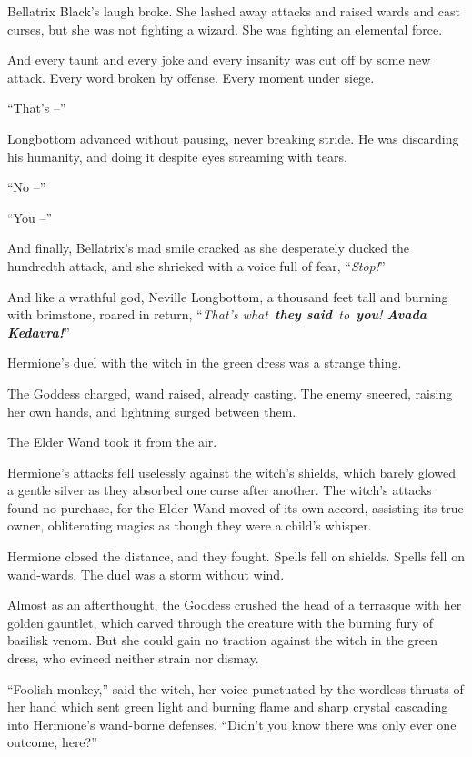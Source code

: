 Bellatrix Black's laugh broke. She lashed away attacks and raised wards
and cast curses, but she was not fighting a wizard. She was fighting an
elemental force.

And every taunt and every joke and every insanity was cut off by some
new attack. Every word broken by offense. Every moment under siege.

``That's --''

Longbottom advanced without pausing, never breaking stride. He was
discarding his humanity, and doing it despite eyes streaming with tears.

``No --''

``You --''

And finally, Bellatrix's mad smile cracked as she desperately ducked the
hundredth attack, and she shrieked with a voice full of fear,
``\emph{Stop!}''

And like a wrathful god, Neville Longbottom, a thousand feet tall and
burning with brimstone, roared in return, ``\emph{That's
what~\textbf{they said}~to~\textbf{you}! \textbf{Avada Kedavra!}}''

\mybreak

Hermione's duel with the witch in the green dress was a strange thing.

The Goddess charged, wand raised, already casting. The enemy sneered,
raising her own hands, and lightning surged between them.

The Elder Wand took it from the air.

Hermione's attacks fell uselessly against the witch's shields, which
barely glowed a gentle silver as they absorbed one curse after another.
The witch's attacks found no purchase, for the Elder Wand moved of its
own accord, assisting its true owner, obliterating magics as though they
were a child's whisper.

Hermione closed the distance, and they fought. Spells fell on shields.
Spells fell on wand-wards. The duel was a storm without wind.

Almost as an afterthought, the Goddess crushed the head of a terrasque
with her golden gauntlet, which carved through the creature with the
burning fury of basilisk venom. But she could gain no traction against
the witch in the green dress, who evinced neither strain nor dismay.

``Foolish monkey,'' said the witch, her voice punctuated by the wordless
thrusts of her hand which sent green light and burning flame and sharp
crystal cascading into Hermione's wand-borne defenses. ``Didn't you know
there was only ever one outcome, here?''

